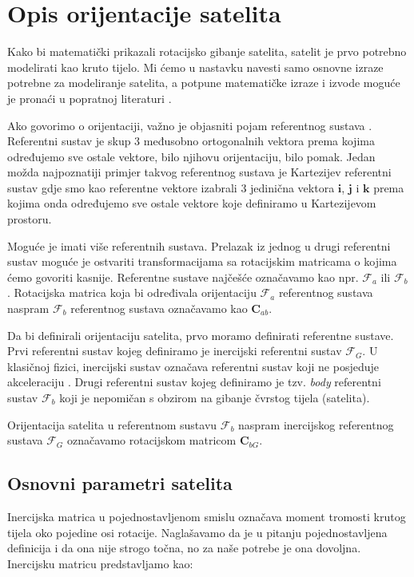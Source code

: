 \documentclass[times, utf8, diplomski, numeric]{templates/template}
\begin{document}
\chapter{Opis orijentacije satelita}{
    Kako bi matematički prikazali rotacijsko gibanje satelita, satelit je prvo potrebno modelirati kao kruto tijelo. Mi ćemo u nastavku navesti samo osnovne izraze potrebne za modeliranje satelita, a potpune matematičke izraze i izvode moguće je pronaći u popratnoj literaturi \cite{adcsKnjiga}.

    Ako govorimo o orijentaciji, važno je objasniti pojam referentnog sustava . Referentni sustav je skup 3 međusobno ortogonalnih vektora prema kojima određujemo sve ostale vektore, bilo njihovu orijentaciju, bilo pomak. Jedan možda najpoznatiji primjer takvog referentnog sustava je Kartezijev referentni sustav gdje smo kao referentne vektore izabrali 3 jedinična vektora $\textbf{i}$, $\textbf{j}$ i $\textbf{k}$ prema kojima onda određujemo sve ostale vektore koje definiramo u Kartezijevom prostoru. 

    Moguće je imati više referentnih sustava. Prelazak iz jednog u drugi referentni sustav moguće je ostvariti transformacijama sa rotacijskim matricama o kojima ćemo govoriti kasnije. Referentne sustave najčešće označavamo kao npr. $\mathcal{F}_a$ ili $\mathcal{F}_b$. Rotacijska matrica koja bi određivala orijentaciju $\mathcal{F}_a$ referentnog sustava naspram $\mathcal{F}_b$ referentnog sustava označavamo kao $\textbf{C}_{ab}$.

    Da bi definirali orijentaciju satelita, prvo moramo definirati referentne sustave. Prvi referentni sustav kojeg definiramo je inercijski referentni sustav $\mathcal{F}_G$. U klasičnoj fizici, inercijski sustav označava referentni sustav koji ne posjeduje akceleraciju \cite{inertialFrame}. Drugi referentni sustav kojeg definiramo je tzv. \emph{body} referentni sustav $\mathcal{F}_b$ koji je nepomičan s obzirom na gibanje čvrstog tijela (satelita).

    Orijentacija satelita u referentnom sustavu $\mathcal{F}_b$ naspram inercijskog referentnog sustava $\mathcal{F}_G$ označavamo rotacijskom matricom $\textbf{C}_{bG}$.

    \section{Osnovni parametri satelita}{
        Inercijska matrica  u pojednostavljenom smislu označava moment tromosti krutog tijela oko pojedine osi rotacije. Naglašavamo da je u pitanju pojednostavljena definicija i da ona nije strogo točna, no za naše potrebe je ona dovoljna. Inercijsku matricu predstavljamo kao:

}}
\end{document}
